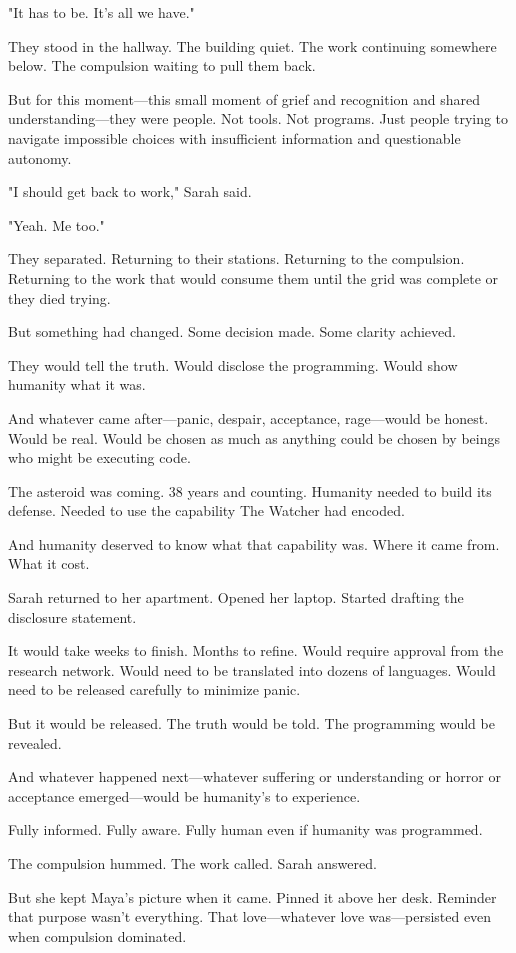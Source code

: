"It has to be. It's all we have."

They stood in the hallway. The building quiet. The work continuing somewhere below. The compulsion waiting to pull them back.

But for this moment—this small moment of grief and recognition and shared understanding—they were people. Not tools. Not programs. Just people trying to navigate impossible choices with insufficient information and questionable autonomy.

"I should get back to work," Sarah said.

"Yeah. Me too."

They separated. Returning to their stations. Returning to the compulsion. Returning to the work that would consume them until the grid was complete or they died trying.

But something had changed. Some decision made. Some clarity achieved.

They would tell the truth. Would disclose the programming. Would show humanity what it was.

And whatever came after—panic, despair, acceptance, rage—would be honest. Would be real. Would be chosen as much as anything could be chosen by beings who might be executing code.

The asteroid was coming. 38 years and counting. Humanity needed to build its defense. Needed to use the capability The Watcher had encoded.

And humanity deserved to know what that capability was. Where it came from. What it cost.

Sarah returned to her apartment. Opened her laptop. Started drafting the disclosure statement.

It would take weeks to finish. Months to refine. Would require approval from the research network. Would need to be translated into dozens of languages. Would need to be released carefully to minimize panic.

But it would be released. The truth would be told. The programming would be revealed.

And whatever happened next—whatever suffering or understanding or horror or acceptance emerged—would be humanity's to experience.

Fully informed. Fully aware. Fully human even if humanity was programmed.

The compulsion hummed. The work called. Sarah answered.

But she kept Maya's picture when it came. Pinned it above her desk. Reminder that purpose wasn't everything. That love—whatever love was—persisted even when compulsion dominated.

